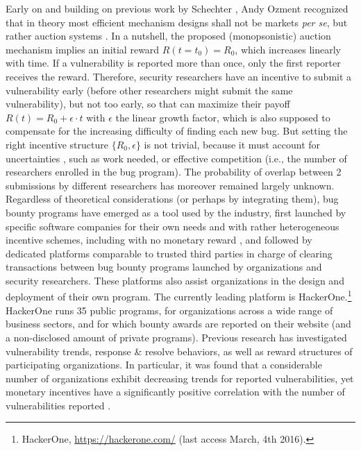 Early on and building on previous work by Schechter \cite{schechter2002buy}, Andy Ozment \cite{ozment2004bug} recognized that in theory most efficient mechanism designs shall not be markets {\it per se}, but rather auction systems \cite{milgrom1982theory}. In a nutshell, the proposed (monopsonistic) auction mechanism implies an initial reward $R(t=t_0) = R_0$, which increases linearly with time. If a vulnerability is reported more than once, only the first reporter receives the reward. Therefore, security researchers have an incentive to submit a vulnerability early (before other researchers might submit the same vulnerability), but not too early, so that can maximize their payoff $R(t) = R_0 + \epsilon \cdot t$ with $\epsilon$ the linear growth factor, which is also supposed to compensate for the increasing difficulty of finding each new bug. But setting the right incentive structure $\{R_0,\epsilon \}$ is not trivial, because it must account for uncertainties \cite{pandey2014assessment}, such as work needed, or effective competition (i.e., the number of researchers enrolled in the bug program). The probability of overlap between 2 submissions by different researchers has moreover remained largely unknown.\\

Regardless of theoretical considerations (or perhaps by integrating them), bug bounty programs have emerged as a tool used by the industry, first launched by specific software companies for their own needs and with rather heterogeneous incentive schemes\cite{finifter2013empirical}, including with no monetary reward \cite{zhao2014exploratory}, and followed by dedicated platforms comparable to trusted third parties in charge of clearing transactions between bug bounty programs launched by organizations and security researchers. These platforms also assist organizations in the design and deployment of their own program. The currently leading platform is HackerOne.\footnote{HackerOne, \url{https://hackerone.com/} (last access March, 4th 2016).} HackerOne runs 35 public programs, for organizations across a wide range of business sectors, and for which bounty awards are reported on their website (and a non-disclosed amount of private programs). Previous research has investigated vulnerability trends, response \& resolve behaviors, as well as reward structures of participating organizations. In particular, it was found that a considerable number of organizations exhibit decreasing trends for reported vulnerabilities, yet monetary incentives have a significantly positive correlation with the number of vulnerabilities reported \cite{zhao2015empirical}.